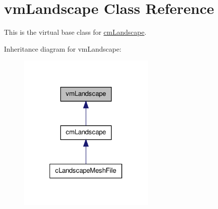 \hypertarget{classvm_landscape}{
\section{vmLandscape Class Reference}
\label{classvm_landscape}
}


This is the virtual base class for \hyperlink{classcm_landscape}{cmLandscape}.  




Inheritance diagram for vmLandscape:
\nopagebreak
\begin{figure}[H]
\begin{center}
\leavevmode
\includegraphics[width=188pt]{classvm_landscape__inherit__graph}
\end{center}
\end{figure}
